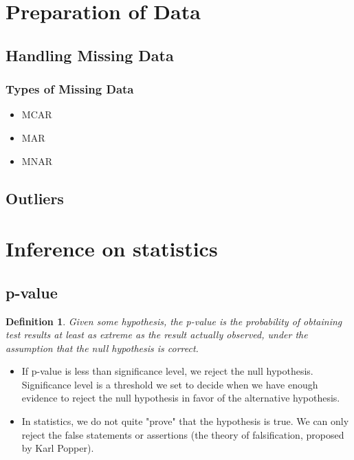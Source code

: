 \documentclass{article}
\newtheorem{definition}{Definition}
\theoremstyle{remark}
\begin{document}
\section{Preparation of Data}
\subsection{Handling Missing Data}
\subsubsection{Types of Missing Data}
\begin{itemize}
\item MCAR
\item MAR
\item MNAR

\end{itemize}

\subsection{Outliers}

\section{Inference on statistics}
\subsection{p-value}
\begin{definition}
Given some hypothesis, the p-value is the probability of obtaining test results at least as extreme as 
the result actually observed, under the assumption that the null hypothesis is correct.
\end{definition}
\begin{itemize}
\item If p-value is less than significance level, we reject the null hypothesis. Significance 
level is a threshold we set to decide when we have enough evidence to reject the null hypothesis in favor of the alternative hypothesis.
\item In statistics, we do not quite "prove" that the hypothesis is true. We can only reject the false statements or assertions (the theory of falsification, proposed by Karl Popper). 
\end{itemize}
\end{document}
